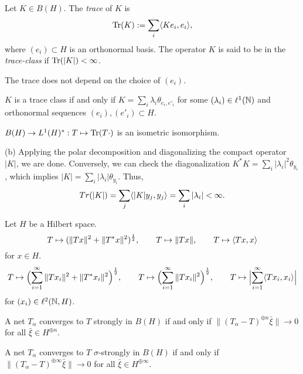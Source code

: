 \documentclass{../../large}
\begin{document}

\begin{prb}
Let $K\in B(H)$.
The \emph{trace} of $K$ is
\[\operatorname{Tr}(K):=\sum_i\langle Ke_i,e_i\rangle,\]
where $(e_i)\subset H$ is an orthonormal basis.
The operator $K$ is said to be in the \emph{trace-class} if $\operatorname{Tr}(|K|)<\infty$.
\begin{parts}
\item
The trace does not depend on the choice of $(e_i)$.
\item
$K$ is a trace class if and only if $K=\sum_i\lambda_i\theta_{e_i,e'_i}$ for some $(\lambda_i)\in\ell^1(\mathbb{N})$ and orthonormal sequences $(e_i),(e'_i)\subset H$.
\item
$B(H)\to L^1(H)^*:T\mapsto\operatorname{Tr}(T\cdot)$ is an isometric isomorphism.
\end{parts}
\end{prb}
\begin{pf}
(b)
Applying the polar decomposition and diagonalizing the compact operator $|K|$, we are done.
Conversely, we can check the diagonalization $K^*K=\sum_i|\lambda_i|^2\theta_{y_i}$, which implies $|K|=\sum_i|\lambda_i|\theta_{y_i}$.
Thus,
\[Tr(|K|)=\sum_j\langle|K|y_j,y_j\rangle=\sum_i|\lambda_i|<\infty.\]

\end{pf}




\begin{prb}
Let $H$ be a Hilbert space.
\[T\mapsto(\|Tx\|^2+\|T^*x\|^2)^{\frac12},\qquad
T\mapsto\|Tx\|,\qquad
T\mapsto\langle Tx,x\rangle\]
for $x\in H$.
\[T\mapsto\Bigl(\sum_{i=1}^\infty\|Tx_i\|^2+\|T^*x_i\|^2\Bigr)^{\frac12},\qquad
T\mapsto\Bigl(\sum_{i=1}^\infty\|Tx_i\|^2\Bigr)^{\frac12},\qquad
T\mapsto\Bigl|\sum_{i=1}^\infty\langle Tx_i,x_i\rangle\Bigr|\]
for $(x_i)\in\ell^2(\mathbb{N},H)$.

\begin{parts}
\item
A net $T_\alpha$ converges to $T$ strongly in $B(H)$ if and only if $\|(T_\alpha-T)^{\oplus n}\bar\xi\|\to0$ for all $\bar\xi\in H^{\oplus n}$.
\item
A net $T_\alpha$ converges to $T$ $\sigma$-strongly in $B(H)$ if and only if $\|(T_\alpha-T)^{\oplus\infty}\bar\xi\|\to0$ for all $\bar\xi\in H^{\oplus\infty}$.
\end{parts}
\end{prb}
\end{document}

